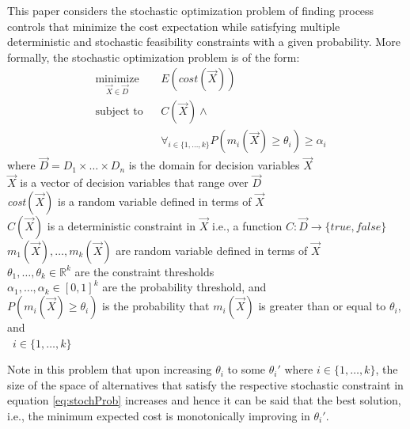 \documentclass[a4paper, 12pt]{article} %
\begin{document}
This paper considers the stochastic optimization problem of finding process controls that minimize the cost expectation while satisfying multiple deterministic and stochastic feasibility constraints with a given probability.
More formally, the stochastic optimization problem is of the form:
\begin{equation}
\label{eq:stochProb}
\begin{aligned}
& \underset{\vec{X}\in\vec{D}}{\text{minimize}}
& & E(\textit{cost}(\vec{X})) \\
& \text{subject to}
& & C(\vec{X}) \wedge \\
&&& \forall_{i\in\{1,\dots,k\}}P(m_i(\vec{X}) \ge \theta_i) \ge \alpha_i
\end{aligned}
\end{equation}
where $\vec{D} = D_1 \times \dots \times D_n$ is the domain for decision variables $\vec{X}$\\
\indent\indent\indent$\vec{X}$ is a vector of decision variables that range over $\vec{D}$\\
\indent\indent\indent\textit{cost}$(\vec{X})$ is a random variable defined in terms of $\vec{X}$\\
\indent\indent\indent$C(\vec{X})$ is a deterministic constraint in $\vec{X}$ i.e., a function $C:\vec{D} \rightarrow \{true,false\}$\\
\indent\indent\indent $m_1(\vec{X}),\dots,m_k(\vec{X})$ are random variable defined in terms of $\vec{X}$\\
\indent\indent\indent$\theta_1,\dots,\theta_k \in \mathbb{R}^k$ are the constraint thresholds \\
\indent\indent\indent$\alpha_1,\dots,\alpha_k \in [0,1]^k$ are the probability threshold, and\\
\indent\indent\indent$P(m_i(\vec{X}) \ge \theta_i)$ is the probability that $m_i(\vec{X})$ is greater than or equal to $\theta_i$, and\\\indent\indent\indent\indent\indent\indent\indent~$i\in\{1,\dots,k\}$

Note in this problem that upon increasing $\theta_i$ to some $\theta_i'$ where $i\in\{1,\dots,k\}$, the size of the space of alternatives that satisfy the respective stochastic constraint in equation \ref{eq:stochProb} increases and hence it can be said that the best solution, i.e., the minimum expected cost is monotonically improving in $\theta_i'$.
\end{document}
